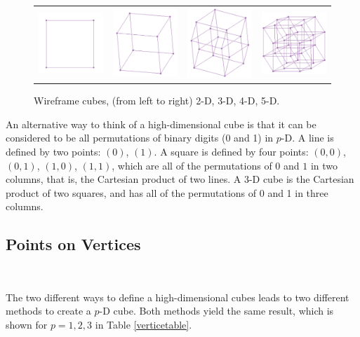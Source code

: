 \begin{figure}[ht]
\centering
\begin{tabular}{cccc}
\includegraphics[width=1in]{fig/cube2D.pdf} & \includegraphics[width=1in]{fig/cube3D.pdf} &
\includegraphics[width=1in]{fig/cube4D.pdf} & \includegraphics[width=1in]{fig/cube5D.pdf}
\end{tabular}
\caption{Wireframe cubes, (from left to right) 2-D, 3-D, 4-D, 5-D.}
\label{boxes}
\end{figure}

An alternative way to think of a high-dimensional cube is that it can
be considered to be all permutations of binary digits (0 and 1) in
$p$-D. A line is defined by two points: $(0)$, $(1)$. A square is
defined by four points: $(0,0)$, $(0,1)$, $(1,0)$, $(1,1)$, which are
all of the permutations of $0$ and $1$ in two columns, that is, the
Cartesian product of two lines. A 3-D cube is the Cartesian product of
two squares, and has all of the permutations of 0 and 1 in three
columns.

\subsection{Points on Vertices}~\label{cube-vertices}

The two different ways to define a high-dimensional cubes leads to two
different methods to create a $p$-D cube. Both methods yield the same
result, which is shown for $p=1,2,3$ in Table \ref{verticetable}.

